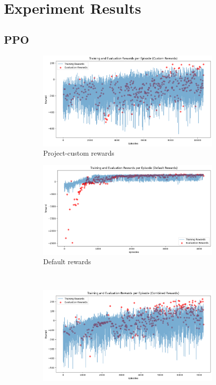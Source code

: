 \documentclass[a4paper, 11pt]{article}
\begin{document}
	\section{Experiment Results}
	\subsection{PPO}
	\begin{figure}[H]
		\begin{center}
		\begin{subfigure}{0.48\textwidth}
			\includegraphics[width=\linewidth]{ppo_figures/custom_env_results.png}
			\caption{Project-custom rewards}
			\label{fig:ppo_rewcust}
		\end{subfigure}\hfill 
		\begin{subfigure}{0.48\textwidth}
		\includegraphics[width=\linewidth]{ppo_figures/default_env_results.png}
		\caption{Default rewards}
		\label{fig:ppo_rewdef}
		\end{subfigure}\\ 
		\begin{subfigure}{0.48\textwidth}
		\includegraphics[width=\linewidth]{ppo_figures/combined_env_results.png}

\end{subfigure}
\end{center}
\end{figure}
\end{document}
